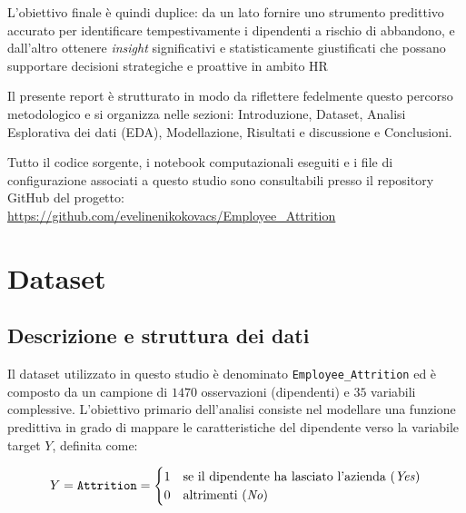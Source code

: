 \documentclass[11pt,a4paper]{article}
\begin{document}
L'obiettivo finale è quindi duplice: da un lato fornire uno strumento predittivo accurato per identificare tempestivamente i dipendenti a rischio di abbandono, e dall'altro ottenere \textit{insight} significativi e statisticamente giustificati che possano supportare decisioni strategiche e proattive in ambito HR 

Il presente report è strutturato in modo da riflettere fedelmente questo percorso metodologico e si organizza nelle sezioni: Introduzione, Dataset, Analisi Esplorativa dei dati (EDA), Modellazione, Risultati e discussione e Conclusioni.

Tutto il codice sorgente, i notebook computazionali eseguiti e i file di configurazione associati a questo studio sono consultabili presso il repository GitHub del progetto: \\
\url{https://github.com/evelinenikokovacs/Employee_Attrition}

\section{Dataset}
\subsection{Descrizione e struttura dei dati}
Il dataset utilizzato in questo studio è denominato \texttt{Employee\_Attrition} ed è composto da un campione di $1470$ osservazioni (dipendenti) e $35$ variabili complessive. L'obiettivo primario dell'analisi consiste nel modellare una funzione predittiva in grado di mappare le caratteristiche del dipendente verso la variabile target $Y$, definita come:

\begin{equation}
Y = \text{\texttt{Attrition}} = 
\begin{cases} 
1 & \text{se il dipendente ha lasciato l'azienda (\textit{Yes})} \\
0 & \text{altrimenti (\textit{No})}
\end{cases}
\end{equation}
\end{document}
